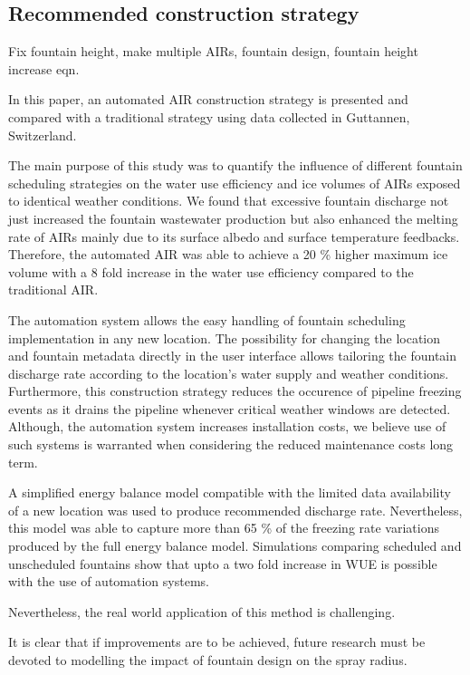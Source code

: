 \documentclass[tc, manuscript]{copernicus}
\begin{document}
\subsection{Recommended construction strategy}
Fix fountain height, make multiple AIRs, fountain design, fountain height increase eqn.

\conclusions

In this paper, an automated AIR construction strategy is presented and compared with a traditional strategy
using data collected in Guttannen, Switzerland.

The main purpose of this study was to quantify the influence of different fountain scheduling strategies on the
water use efficiency and ice volumes of AIRs exposed to identical weather conditions. We found that excessive
fountain discharge not just increased the fountain wastewater production but also enhanced the melting rate of
AIRs mainly due to its surface albedo and surface temperature feedbacks. Therefore, the automated AIR was able
to achieve a 20 \% higher maximum ice volume with a 8 fold increase in the water use efficiency compared to the
traditional AIR.

The automation system allows the easy handling of fountain scheduling implementation in any new location. The
possibility for changing the location and fountain metadata directly in the user interface allows tailoring the
fountain discharge rate according to the location's water supply and weather conditions. Furthermore, this
construction strategy reduces the occurence of pipeline freezing events as it drains the pipeline whenever
critical weather windows are detected. Although, the automation system increases installation costs, we believe
use of such systems is warranted when considering the reduced maintenance costs long term.

A simplified energy balance model compatible with the limited data availability of a new location was used to
produce recommended discharge rate. Nevertheless, this model was able to capture more than 65 \% of the freezing
rate variations produced by the full energy balance model. Simulations comparing scheduled and unscheduled
fountains show that upto a two fold increase in WUE is possible with the use of automation systems.

Nevertheless, the real world application of this method is challenging. 

It is clear that if improvements are to be achieved, future research must be devoted to modelling the impact of
fountain design on the spray radius.
\end{document}
